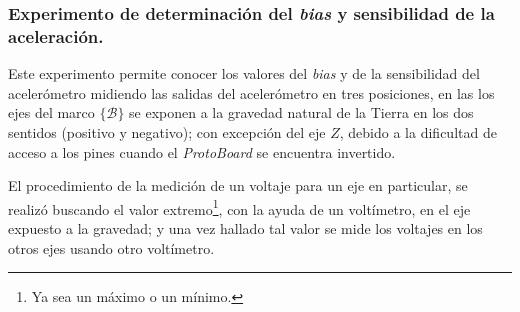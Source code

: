 \documentclass[10pt]{report}
\numberwithin{equation}{chapter}
\numberwithin{algorithm}{chapter}
\newcommand{\bias}{\emph{bias} }
\newcommand{\marco}[1]{\{\mathcal{#1}\}}
\begin{document}
\subsubsection{Experimento de determinación del \bias y sensibilidad de la aceleración.}
Este experimento permite conocer los valores del \bias y de la sensibilidad del acelerómetro midiendo las salidas del acelerómetro en tres posiciones, en las los ejes del marco $\marco{B}$ se exponen a la gravedad natural de la Tierra en los dos sentidos (positivo y negativo); con excepción del eje $Z$, debido a la dificultad de acceso a los pines cuando el \emph{ProtoBoard} se encuentra invertido. \par
El procedimiento de la medición de un voltaje para un eje en particular, se realizó buscando el valor extremo\footnote{Ya sea un máximo o un mínimo.}, con la ayuda de un voltímetro, en el eje expuesto a la gravedad; y una vez hallado tal valor se mide los voltajes en los otros ejes usando otro voltímetro.\par
\end{document}
